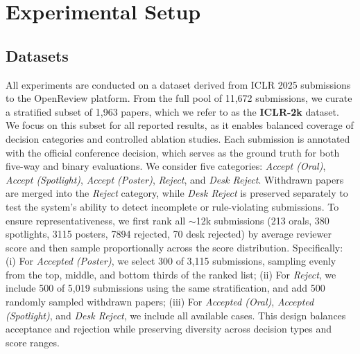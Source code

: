 \documentclass{article} %
\begin{document}
\section{Experimental Setup}
\subsection{Datasets}

All experiments are conducted on a dataset derived from ICLR 2025 submissions to the OpenReview platform. From the full pool of 11,672 submissions, we curate a stratified subset of 1,963 papers, which we refer to as the \textbf{ICLR-2k} dataset. We focus on this subset for all reported results, as it enables balanced coverage of decision categories and controlled ablation studies.
Each submission is annotated with the official conference decision, which serves as the ground truth for both five-way and binary evaluations. We consider five categories:  
\textit{Accept (Oral)}, \textit{Accept (Spotlight)}, \textit{Accept (Poster)}, \textit{Reject}, and \textit{Desk Reject}.  
Withdrawn papers are merged into the \textit{Reject} category, while \textit{Desk Reject} is preserved separately to test the system’s ability to detect incomplete or rule-violating submissions.
To ensure representativeness, we first rank all $\sim$12k submissions (213 orals, 380 spotlights, 3115 posters, 7894 rejected, 70 desk rejected) by average reviewer score and then sample proportionally across the score distribution. Specifically:  
(i) For \textit{Accepted (Poster)}, we select 300 of 3,115 submissions, sampling evenly from the top, middle, and bottom thirds of the ranked list;  
(ii) For \textit{Reject}, we include 500 of 5,019 submissions using the same stratification, and add 500 randomly sampled withdrawn papers;  
(iii) For \textit{Accepted (Oral)}, \textit{Accepted (Spotlight)}, and \textit{Desk Reject}, we include all available cases.  
This design balances acceptance and rejection while preserving diversity across decision types and score ranges.  
\end{document}
